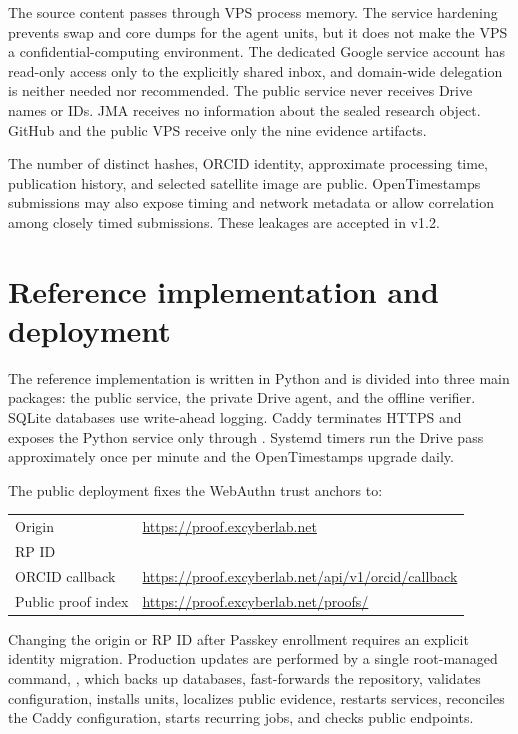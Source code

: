 \documentclass[11pt,a4paper]{article}
\newcommand{\code}[1]{\texttt{\detokenize{#1}}}
\begin{document}
The source content passes through VPS process memory. The service hardening prevents swap and core dumps for the agent units, but it does not make the VPS a confidential-computing environment. The dedicated Google service account has read-only access only to the explicitly shared inbox, and domain-wide delegation is neither needed nor recommended. The public service never receives Drive names or IDs. JMA receives no information about the sealed research object. GitHub and the public VPS receive only the nine evidence artifacts.

The number of distinct hashes, ORCID identity, approximate processing time, publication history, and selected satellite image are public. OpenTimestamps submissions may also expose timing and network metadata or allow correlation among closely timed submissions. These leakages are accepted in v1.2.

\section{Reference implementation and deployment}

The reference implementation is written in Python and is divided into three main packages: the public service, the private Drive agent, and the offline verifier. SQLite databases use write-ahead logging. Caddy terminates HTTPS and exposes the Python service only through \code{127.0.0.1:8787}. Systemd timers run the Drive pass approximately once per minute and the OpenTimestamps upgrade daily.

The public deployment fixes the WebAuthn trust anchors to:

\begin{center}
\begin{tabular}{ll}
\toprule
Origin & \url{https://proof.excyberlab.net} \\
RP ID & \code{proof.excyberlab.net} \\
ORCID callback & \url{https://proof.excyberlab.net/api/v1/orcid/callback} \\
Public proof index & \url{https://proof.excyberlab.net/proofs/} \\
\bottomrule
\end{tabular}
\end{center}

Changing the origin or RP ID after Passkey enrollment requires an explicit identity migration. Production updates are performed by a single root-managed command, \code{skyseal-update}, which backs up databases, fast-forwards the repository, validates configuration, installs units, localizes public evidence, restarts services, reconciles the Caddy configuration, starts recurring jobs, and checks public endpoints.
\end{document}

